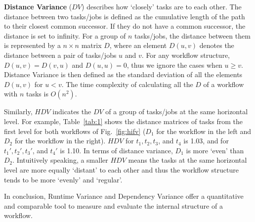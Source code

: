 \documentclass[final,5p,times,twocolumn]{elsarticle}
\begin{document}
\textbf{Distance Variance} ($DV$) describes how `closely' tasks are to each other. The distance between two tasks/jobs is defined as the cumulative length of the path to their closest common successor. If they do not have a common successor, the distance is set to infinity. For a group of $n$ tasks/jobs, the distance between them is represented by a $n \times n$ matrix $D$, where an element $D(u,v)$ denotes the distance between a pair of tasks/jobs $u$ and $v$. For any workflow structure, $D(u,v)=D(v,u)$ and $D(u,u)=0$, thus we ignore the cases when $u \geq v$. Distance Variance is then defined as the standard deviation of all the elements $D(u,v)$ for $u<v$. The time complexity of calculating all the $D$ of a workflow with $n$ tasks is $O(n^2)$. 

Similarly, $HDV$ indicates the $DV$ of a group of tasks/jobs at the same horizontal level. For example, Table~\ref{tab:1} shows the distance matrices of tasks from the first level for both workflows of Fig.~\ref{fig:hifv} ($D_1$ for the workflow in the left and $D_2$ for the workflow in the right). $HDV$ for $t_1, t_2, t_3$, and $t_4$ is 1.03, and for $t_1', t_2', t_3'$, and $t_4'$ is 1.10. In terms of distance variance, $D_1$ is more `even' than $D_2$. Intuitively speaking, a smaller $HDV$ means the tasks at the same horizontal level are more equally `distant' to each other and thus the workflow structure tends to be more `evenly' and `regular'. 

In conclusion, Runtime Variance and Dependency Variance offer a quantitative and comparable tool to measure and evaluate the internal structure of a workflow. 


\end{document}
